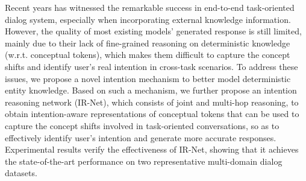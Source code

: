 Recent years has witnessed the remarkable success in end-to-end task-oriented dialog system, especially when incorporating external knowledge information.  However, the quality of most existing models' generated response is still limited, mainly due to their lack of fine-grained reasoning on deterministic knowledge  (w.r.t. conceptual tokens), which makes them difficult to capture the concept shifts and identify user's real intention in cross-task scenarios. To address these issues,  we propose a novel intention mechanism to better model deterministic entity knowledge. Based on such a mechanism,  we further propose an intention reasoning network (IR-Net), which consists of joint and multi-hop reasoning, to obtain intention-aware representations of conceptual tokens that can be used to capture the concept shifts involved in task-oriented conversations, so as to effectively identify user's intention and generate more accurate responses.  Experimental results verify the effectiveness of IR-Net, showing that it achieves the state-of-the-art performance on two representative multi-domain dialog datasets.
